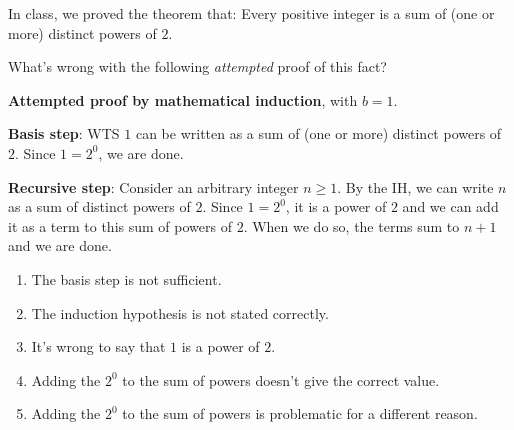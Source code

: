 
In class, we proved the theorem that: 
Every positive integer is a sum of (one or more) distinct powers of $2$.

What's wrong with the following {\it attempted} proof of this fact?


{\bf Attempted proof by mathematical induction}, with $b=1$.

{\bf Basis step}: WTS $1$ can be written 
as a sum of (one or more) distinct powers of $2$. Since $1 =2^0$, 
we are done.

{\bf Recursive step}: Consider an arbitrary integer $n \geq 1$.
By the IH, we can write $n$ as a sum of distinct powers of $2$.
Since $1 = 2^0$, it is a power of $2$ and we can add it as a term 
to this sum of powers of $2$. When we do so, the terms sum to $n+1$
and we are done.

\begin{enumerate}
\item The basis step is not sufficient.
\item The induction hypothesis is not stated correctly.
\item It's wrong to say that $1$ is a power of $2$.
\item Adding the $2^0$ to the sum of powers doesn't give the correct value.
\item Adding the $2^0$ to the sum of powers 
is problematic for a different reason.
\end{enumerate}
